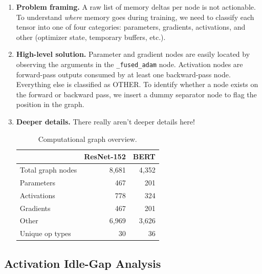 \documentclass[11pt]{article}
\begin{document}
\begin{enumerate}[label=\alph*),nosep,leftmargin=*]
\item \textbf{Problem framing.}
A raw list of memory deltas per node is not actionable. To understand \emph{where} memory goes during training, we need to classify each tensor into one of four categories: parameters, gradients, activations, and other (optimizer state, temporary buffers, etc.).

\item \textbf{High-level solution.}
Parameter and gradient nodes are easily located by observing the arguments in the \texttt{\_fused\_adam} node. Activation nodes are forward-pass outputs consumed by at least one backward-pass node. Everything else is classified as OTHER. To identify whether a node exists on the forward or backward pass, we insert a dummy separator node to flag the position in the graph.

\item \textbf{Deeper details.}
There really aren't deeper details here!

\begin{table}[h]
\centering
\caption{Computational graph overview.}
\label{tab:overview}
\begin{tabular}{lrr}
\toprule
 & \textbf{ResNet-152} & \textbf{BERT} \\
\midrule
Total graph nodes   & 8{,}681 & 4{,}352 \\
Parameters          & 467     & 201     \\
Activations         & 778     & 324     \\
Gradients           & 467     & 201     \\
Other               & 6{,}969 & 3{,}626 \\
Unique op types     & 30      & 36      \\
\bottomrule
\end{tabular}
\end{table}
\end{enumerate}

\subsection{Activation Idle-Gap Analysis}
\end{document}
